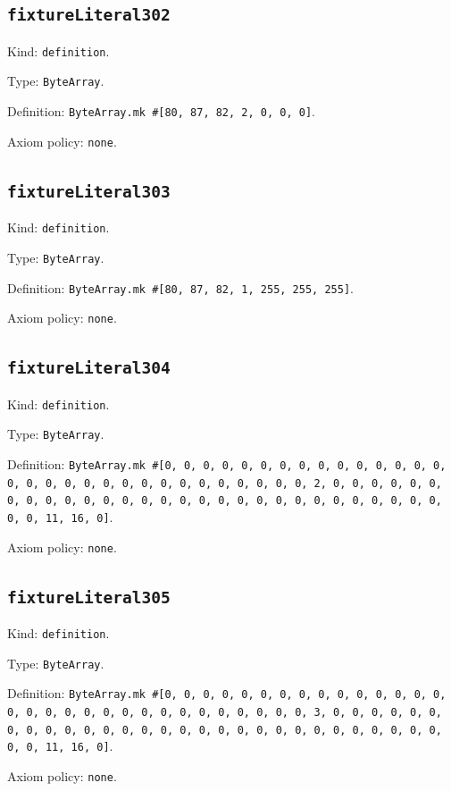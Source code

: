\documentclass[11pt]{article}
\begin{document}
\subsection*{\texttt{fixtureLiteral302}}
\noindent Kind: \texttt{definition}.\par
\noindent Type: \texttt{ByteArray}.\par
\noindent Definition: \texttt{ByteArray.mk \#[80, 87, 82, 2, 0, 0, 0]}.\par
\noindent Axiom policy: \texttt{none}.\par
\subsection*{\texttt{fixtureLiteral303}}
\noindent Kind: \texttt{definition}.\par
\noindent Type: \texttt{ByteArray}.\par
\noindent Definition: \texttt{ByteArray.mk \#[80, 87, 82, 1, 255, 255, 255]}.\par
\noindent Axiom policy: \texttt{none}.\par
\subsection*{\texttt{fixtureLiteral304}}
\noindent Kind: \texttt{definition}.\par
\noindent Type: \texttt{ByteArray}.\par
\noindent Definition: \texttt{ByteArray.mk \#[0, 0, 0, 0, 0, 0, 0, 0, 0, 0, 0, 0, 0, 0, 0, 0, 0, 0, 0, 0, 0, 0, 0, 0, 0, 0, 0, 0, 0, 0, 0, 2, 0, 0, 0, 0, 0, 0, 0, 0, 0, 0, 0, 0, 0, 0, 0, 0, 0, 0, 0, 0, 0, 0, 0, 0, 0, 0, 0, 0, 0, 0, 0, 11, 16, 0]}.\par
\noindent Axiom policy: \texttt{none}.\par
\subsection*{\texttt{fixtureLiteral305}}
\noindent Kind: \texttt{definition}.\par
\noindent Type: \texttt{ByteArray}.\par
\noindent Definition: \texttt{ByteArray.mk \#[0, 0, 0, 0, 0, 0, 0, 0, 0, 0, 0, 0, 0, 0, 0, 0, 0, 0, 0, 0, 0, 0, 0, 0, 0, 0, 0, 0, 0, 0, 0, 3, 0, 0, 0, 0, 0, 0, 0, 0, 0, 0, 0, 0, 0, 0, 0, 0, 0, 0, 0, 0, 0, 0, 0, 0, 0, 0, 0, 0, 0, 0, 0, 11, 16, 0]}.\par
\noindent Axiom policy: \texttt{none}.\par
\end{document}
